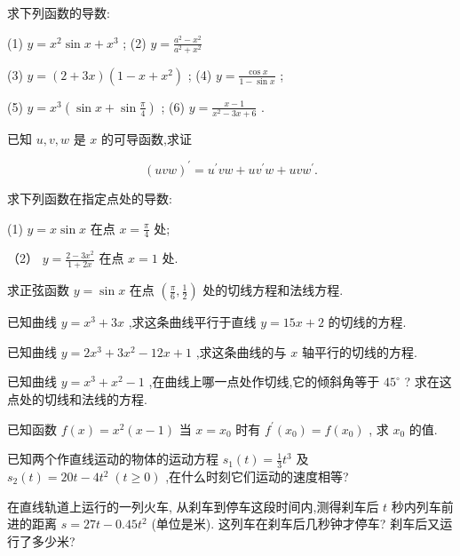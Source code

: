 \documentclass[lang=cn,newtx,12pt,scheme=chinese]{elegantbook}
\begin{document}
\begin{problemset}[习 题 五]

\item 求下列函数的导数:

(1) \(y = {x}^{2}\sin x + {x}^{3}\) ; (2) \(y = \frac{{a}^{2} - {x}^{2}}{{a}^{2} + {x}^{2}}\)

(3) \(y = \left( {2 + {3x}}\right) \left( {1 - x + {x}^{2}}\right)\) ; (4) \(y = \frac{\cos x}{1 - \sin x}\) ;

(5) \(y = {x}^{3}\left( {\sin x + \sin \frac{\pi }{4}}\right)\) ; (6) \(y = \frac{x - 1}{{x}^{2} - {3x} + 6}\) .

\item 已知 \(u,v,w\) 是 \(x\) 的可导函数,求证

\[
{\left( uvw\right) }^{\prime } = {u}^{\prime }{vw} + u{v}^{\prime }w + {uv}{w}^{\prime }.
\]

\item 求下列函数在指定点处的导数:

(1) \(y = x\sin x\) 在点 \(x = \frac{\pi }{4}\) 处;

（2） \(y = \frac{2 - 3{x}^{2}}{1 + {2x}}\) 在点 \(x = 1\) 处.

\item 求正弦函数 \(y = \sin x\) 在点 \(\left( {\frac{\pi }{6},\frac{1}{2}}\right)\) 处的切线方程和法线方程.

\item 已知曲线 \(y = {x}^{3} + {3x}\) ,求这条曲线平行于直线 \(y = {15x} + 2\) 的切线的方程.

\item 已知曲线 \(y = 2{x}^{3} + 3{x}^{2} - {12x} + 1\) ,求这条曲线的与 \(x\) 轴平行的切线的方程.

\item 已知曲线 \(y = {x}^{3} + {x}^{2} - 1\) ,在曲线上哪一点处作切线,它的倾斜角等于 \({45}^{ \circ }\) ? 求在这点处的切线和法线的方程.

\item 已知函数 \(f\left( x\right) = {x}^{2}\left( {x - 1}\right)\) 当 \(x = {x}_{0}\) 时有 \({f}^{\prime }\left( {x}_{0}\right) = f\left( {x}_{0}\right)\) , 求 \({x}_{0}\) 的值.

\item 已知两个作直线运动的物体的运动方程 \({s}_{1}\left( t\right) = \frac{1}{3}{t}^{3}\) 及 \({s}_{2}\left( t\right) = {20t} - 4{t}^{2}\;\left( {t \geq 0}\right)\) ,在什么时刻它们运动的速度相等?

\item 在直线轨道上运行的一列火车, 从刹车到停车这段时间内,测得刹车后 \(t\) 秒内列车前进的距离 \(s = {27t} - {0.45}{t}^{2}\) (单位是米). 这列车在刹车后几秒钟才停车? 刹车后又运行了多少米?


\end{problemset}
\end{document}
